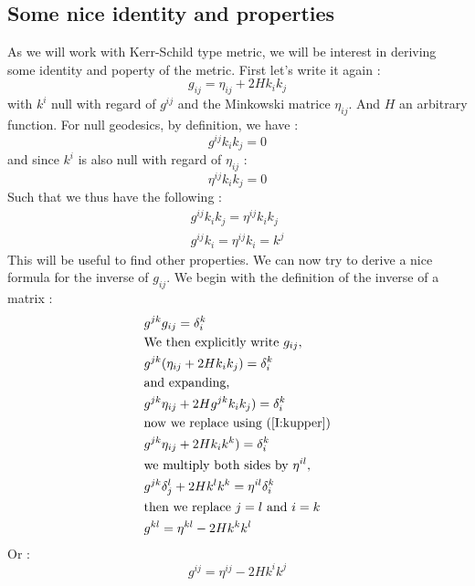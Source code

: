 \documentclass[a4paper,12pt]{article}
\theoremstyle{definition}
\begin{document}
\subsection{Some nice identity and properties}
As we will work with Kerr-Schild type metric, we will be interest in deriving some identity and poperty of the metric.
First let's write it again :
\begin{equation}
	g_{ij}=\eta_{ij}+2Hk_ik_j
\end{equation}
with $k^i$ null with regard of $g^{ij}$ and the Minkowski matrice $\eta_{ij}$.
And $H$ an arbitrary function.
For null geodesics, by definition, we have :
\begin{equation}
	g^{ij}k_ik_j=0
\end{equation}
and since $k^i$ is also null with regard of $\eta_{ij}$ :
\begin{equation}
	\eta^{ij}k_ik_j=0
\end{equation}
Such that we thus have the following :
\begin{align}
	g^{ij}k_ik_j=\eta^{ij}k_ik_j \label{I:kequi}\\
	g^{ij}k_i=\eta^{ij}k_i=k^j \label{I:kupper}
\end{align}
This will be useful to find other properties.
We can now try to derive a nice formula for the inverse of $g_{ij}$.
We begin with the definition of the inverse of a matrix :
\begin{equation}
\begin{split}
	&g^{jk}g_{ij}=\delta^k_i \\
	&\text{We then explicitly write } g_{ij},\\
	&g^{jk}(\eta_{ij}+2Hk_ik_j)=\delta^k_i\\
	&\text{and expanding,}\\
	&g^{jk}\eta_{ij}+2Hg^{jk}k_ik_j)=\delta^k_i\\
	&\text{now we replace using (\ref{I:kupper})}\\
	&g^{jk}\eta_{ij}+2Hk_ik^k)=\delta^k_i\\
	&\text{we multiply both sides by }\eta^{il},\\
	&g^{jk}\delta^l_j+2Hk^lk^k=\eta^{il}\delta^k_i\\
	&\text{then we replace $j=l$ and $i=k$}\\
	&g^{kl}=\eta^{kl}-2Hk^kk^l
\end{split}
\end{equation}
Or :
\begin{equation}
	g^{ij}=\eta^{ij}-2Hk^ik^j
\end{equation}
\end{document}
